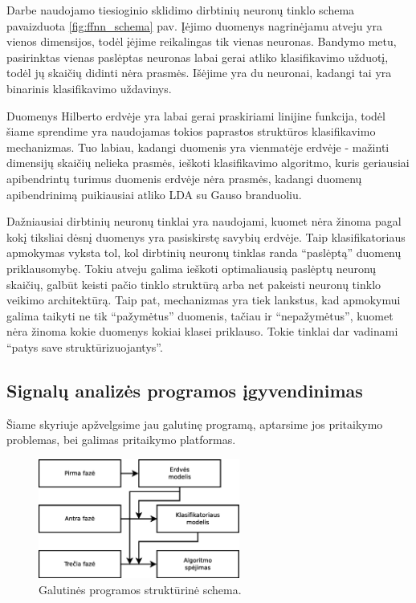 \documentclass[]{vgtuef}
\begin{document}
Darbe naudojamo tiesioginio sklidimo dirbtinių neuronų tinklo schema pavaizduota \ref{fig:ffnn_schema} pav. Įėjimo duomenys nagrinėjamu atveju yra vienos dimensijos, todėl įėjime reikalingas tik vienas neuronas. Bandymo metu, pasirinktas vienas paslėptas neuronas labai gerai atliko klasifikavimo užduotį, todėl jų skaičių didinti nėra prasmės. Išėjime yra du neuronai, kadangi tai yra binarinis klasifikavimo uždavinys.

Duomenys Hilberto erdvėje yra labai gerai praskiriami linijine funkcija, todėl šiame sprendime yra naudojamas tokios paprastos struktūros klasifikavimo mechanizmas. Tuo labiau, kadangi duomenis yra vienmatėje erdvėje - mažinti dimensijų skaičių nelieka prasmės, ieškoti klasifikavimo algoritmo, kuris geriausiai apibendrintų turimus duomenis erdvėje nėra prasmės, kadangi duomenų apibendrinimą puikiausiai atliko LDA su Gauso branduoliu.

Dažniausiai dirbtinių neuronų tinklai yra naudojami, kuomet nėra žinoma pagal kokį tiksliai dėsnį duomenys yra pasiskirstę savybių erdvėje. Taip klasifikatoriaus apmokymas vyksta tol, kol dirbtinių neuronų tinklas randa ``paslėptą'' duomenų priklausomybę. Tokiu atveju galima ieškoti optimaliausią paslėptų neuronų skaičių, galbūt keisti pačio tinklo struktūrą arba net pakeisti neuronų tinklo veikimo architektūrą. Taip pat, mechanizmas yra tiek lankstus, kad apmokymui galima taikyti ne tik ``pažymėtus'' duomenis, tačiau ir ``nepažymėtus'', kuomet nėra žinoma kokie duomenys kokiai klasei priklauso. Tokie tinklai dar vadinami ``patys save struktūrizuojantys''.

\subsection{Signalų analizės programos įgyvendinimas}
\label{subsec:total_program}

Šiame skyriuje apžvelgsime jau galutinę programą, aptarsime jos pritaikymo problemas, bei galimas pritaikymo platformas.

\begin{figure}[!t]
  \centering
  \includegraphics[width=250px]{figures/galutine_programa.eps}
  \caption{Galutinės programos struktūrinė schema.}
  \label{fig:galutine_programa}
\end{figure}
\end{document}

